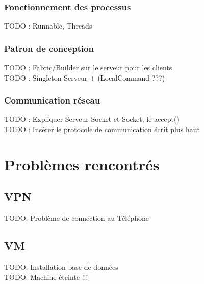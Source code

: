 \documentclass[a4paper, 11pt]{report}
\begin{document}
	\subsection{Fonctionnement des processus}
		TODO : Runnable, Threads
	\subsection{Patron de conception}
		TODO : Fabric/Builder sur le serveur pour les clients\\
		TODO : Singleton Serveur + (LocalCommand ???)
	\subsection{Communication réseau}
		TODO : Expliquer Serveur Socket et Socket, le accept()\\
		TODO : Insérer le protocole de communication écrit plus haut
\chapter{Problèmes rencontrés}
\section{VPN}
	TODO: Problème de connection au Téléphone
\section{VM}
	TODO: Installation base de données\\
	TODO: Machine éteinte !!!
\end{document}
